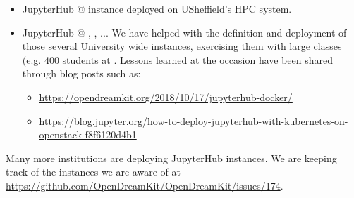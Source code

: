 \begin{itemize}
\item{JupyterHub @ }
  \href{http://docs.iceberg.shef.ac.uk/en/latest/using-iceberg/accessing/jupyterhub.html}{\JupyterHub}
  instance deployed on USheffield's HPC system.

\item{JupyterHub @ , , ...} We have helped with
  the definition and deployment of those several University wide
  instances, exercising them with large classes (e.g. 400 students at
  . Lessons learned at the occasion have been shared
  through blog posts such as:
  \begin{itemize}
  \item \url{https://opendreamkit.org/2018/10/17/jupyterhub-docker/}
  \item \url{https://blog.jupyter.org/how-to-deploy-jupyterhub-with-kubernetes-on-openstack-f8f6120d4b1}
  \end{itemize}
\end{itemize}

Many more institutions are deploying JupyterHub instances. We are
keeping track of the instances we are aware of at
\url{https://github.com/OpenDreamKit/OpenDreamKit/issues/174}.


